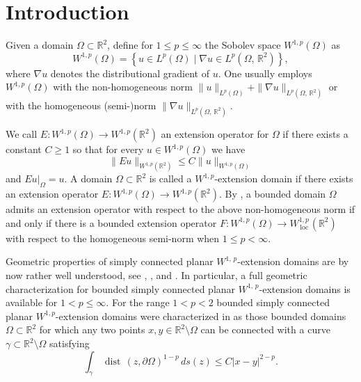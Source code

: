 \documentclass[reqno,11pt]{amsart}
\def\rr{{\mathbb R}}
\def\dist{{\mathop\mathrm{\,dist\,}}}
\def\loc{{\mathop\mathrm{\,loc\,}}}
\numberwithin{equation}{section}
\theoremstyle{remark}
\begin{document}
\tableofcontents


\section{Introduction}

Given a domain $\Omega \subset\mathbb R^2$, define for $1 \le p\le \infty$ 
the Sobolev space $W^{1,p}(\Omega)$ as
\[
 W^{1,p}(\Omega) = \left\{u \in L^p(\Omega)\mid\nabla u \in L^p(\Omega,\,\mathbb R^2)\right\},
\]
where $\nabla u$ denotes the distributional gradient of $u$. 
One usually employs $W^{1,p}(\Omega)$ with the non-homogeneous norm
$\|u\|_{L^p(\Omega)} + \|\nabla u\|_{L^p(\Omega,\,\mathbb R^2)}$ or with the
homogeneous (semi-)norm $\|\nabla u\|_{L^p(\Omega,\,\mathbb R^2)}$. 


We call $E \colon W^{1,p}(\Omega) \to W^{1,p}(\mathbb R^2)$ an extension 
operator for $\Omega$
if there exists a constant $C \ge 1$ so that for every 
$u \in W^{1,p}(\Omega)$ we have 
\[
\|Eu\|_{W^{1,p}(\mathbb R^2)} \le C\|u\|_{W^{1,p}(\Omega)} 
\]
and $Eu|_\Omega = u$. A domain $\Omega \subset \mathbb R^2$
is called a $W^{1,p}$-extension domain if there exists an extension operator
$E \colon W^{1,p}(\Omega) \to W^{1,p}(\mathbb R^2)$. By \cite{HK1991}, a 
bounded domain $\Omega$ admits an extension operator with respect to the 
above non-homogeneous norm
if and only if there is a bounded extension operator $F\colon W^{1,p}(\Omega)\to W^{1,p}_{\loc}(\mathbb R^2)$ with respect to
the homogeneous semi-norm
when $1\le p<\infty$. 


Geometric properties of simply connected planar $W^{1,\,p}$-extension domains 
are by now rather
well understood, see 
\cite{GLV1979}, \cite{J1981}, \cite{S2010} and \cite{KRZ2015}.
In particular, a full geometric characterization for bounded simply 
connected planar $W^{1,\,p}$-extension domains 
is available for $1<p\le \infty$. 
For the range $1 < p < 2$  bounded simply connected planar 
$W^{1,p}$-extension domains were characterized in \cite{KRZ2015}
as  those bounded domains $\Omega \subset \rr^2$
for which any two points $x,y \in \rr^2 \setminus \Omega$ can be connected 
with a curve  $\gamma\subset \rr^2 \setminus \Omega$  satisfying
\begin{equation}\label{eq:pgeaterthan1}
 \int_\gamma \dist(z,\partial \Omega)^{1-p}\,ds(z)  \le C |x-y|^{2-p}.
\end{equation}
\end{document}
